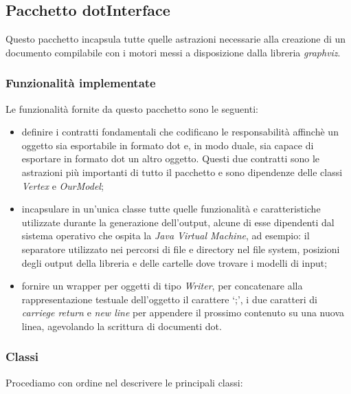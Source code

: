 \subsection{Pacchetto dotInterface}
\label{subsection:dotInterface-package-description}
Questo pacchetto incapsula tutte quelle astrazioni necessarie alla
creazione di un documento compilabile con i motori messi a
disposizione dalla libreria \emph{graphviz}.

\subsubsection*{Funzionalit\`a implementate}

Le funzionalit\`a fornite da questo pacchetto sono le seguenti:
\begin{itemize}
\item definire i contratti fondamentali che codificano le
  responsabilit\`a affinch\`e un oggetto sia esportabile in formato
  dot e, in modo duale, sia capace di esportare in formato dot un
  altro oggetto. Questi due contratti sono le astrazioni pi\`u
  importanti di tutto il pacchetto e sono dipendenze delle classi
  \emph{Vertex} e \emph{OurModel};
\item incapsulare in un'unica classe tutte quelle funzionalit\`a e
  caratteristiche utilizzate durante la generazione dell'output,
  alcune di esse dipendenti dal sistema operativo che ospita la
  \emph{Java Virtual Machine}, ad esempio: il separatore utilizzato
  nei percorsi di file e directory nel file system, posizioni degli
  output della libreria e delle cartelle dove trovare i modelli di
  input;
\item fornire un wrapper per oggetti di tipo \emph{Writer}, per
  concatenare alla rappresentazione testuale dell'oggetto il carattere
  `;', i due caratteri di \emph{carriege return} e \emph{new line} per
  appendere il prossimo contenuto su una nuova linea, agevolando la
  scrittura di documenti dot.
\end{itemize}

\subsubsection*{Classi}
Procediamo con ordine nel descrivere le principali classi:

